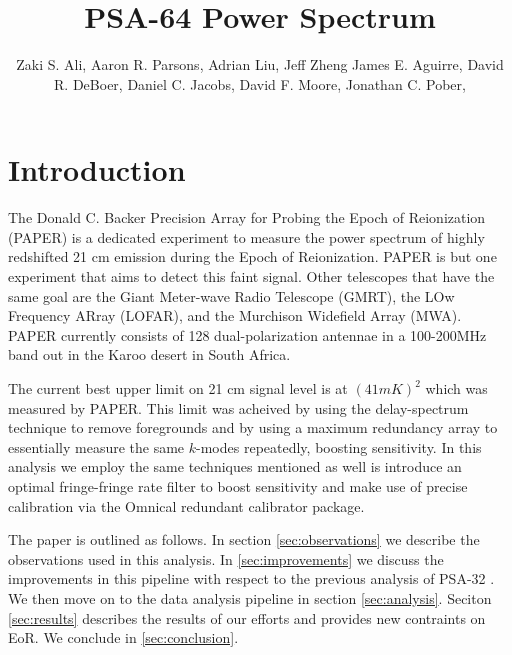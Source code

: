 \documentclass[twocolumn,numberedappendix]{emulateapj}
\begin{document}
\title{PSA-64 Power Spectrum}

\author{
Zaki S. Ali,
Aaron R. Parsons,
Adrian Liu,
Jeff Zheng
James E. Aguirre,
David R. DeBoer,
Daniel C. Jacobs,
David F. Moore,
Jonathan C. Pober,
}


\begin{abstract}
\end{abstract}


\section{Introduction}
The Donald C. Backer Precision Array for Probing the Epoch of Reionization
(PAPER) is a dedicated experiment to measure the power spectrum of highly
redshifted 21 cm emission during the Epoch of Reionization. PAPER is but one
experiment that aims to detect this faint signal. Other telescopes that have the
same goal are the Giant Meter-wave Radio Telescope (GMRT), the LOw Frequency
ARray (LOFAR), and the Murchison Widefield Array (MWA). PAPER currently consists
of 128 dual-polarization antennae in a 100-200MHz band out in the Karoo desert
in South Africa. 

The current best upper limit on 21 cm signal level is at $(41 mK)^{2}$ which was
measured by PAPER. This limit was acheived by using the delay-spectrum technique
to remove foregrounds and by using a maximum redundancy array to essentially
measure the same $k$-modes repeatedly, boosting sensitivity. In this analysis we
employ the same techniques mentioned as well is introduce an optimal fringe-fringe
rate filter to  boost sensitivity and make use of precise calibration via
the Omnical redundant calibrator package. 

The paper is outlined as follows. In section \ref{sec:observations} we describe
the observations used in this analysis. In \ref{sec:improvements} we discuss the
improvements in this pipeline with respect to the previous analysis of PSA-32
\cite{parsons_et_al2014}. We then move on to the data analysis pipeline in
section \ref{sec:analysis}. Seciton \ref{sec:results} describes the results of
 our efforts and provides new contraints on EoR. We conclude in
\ref{sec:conclusion}.
\end{document}
